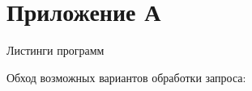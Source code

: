 \chapter*{Приложение А}
\centerline{Листинги программ}

Обход возможных вариантов обработки запроса:


